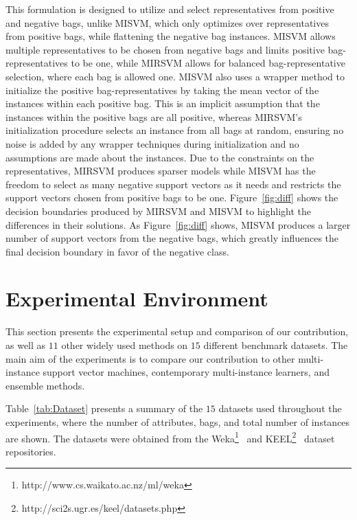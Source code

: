 \documentclass[reqno]{vcuthesis}
\numberwithin{equation}{chapter}
\begin{document}
This formulation is designed to utilize and select representatives from positive and negative bags, unlike MISVM, which only optimizes over representatives from positive bags, while flattening the negative bag instances. MISVM allows multiple representatives to be chosen from negative bags and limits positive bag-representatives to be one, while MIRSVM allows for balanced bag-representative selection, where each bag is allowed one. MISVM also uses a wrapper method to initialize the positive bag-representatives by taking the mean vector of the instances within each positive bag. This is an implicit assumption that the instances within the positive bags are all positive, whereas MIRSVM's initialization procedure selects an instance from all bags at random, ensuring no noise is added by any wrapper techniques during initialization and no assumptions are made about the instances. Due to the constraints on the representatives, MIRSVM produces sparser models while MISVM has the freedom to select as many negative support vectors as it needs and restricts the support vectors chosen from positive bags to be one. Figure~\ref{fig:diff} shows the decision boundaries produced by MIRSVM and MISVM to highlight the differences in their solutions. As Figure~\ref{fig:diff} shows, MISVM produces a larger number of support vectors from the negative bags, which greatly influences the final decision boundary in favor of the negative class.

\section{Experimental Environment}
This section presents the experimental setup and comparison of our contribution, as well as $11$ other widely used methods on $15$ different benchmark datasets. The main aim of the experiments is to compare our contribution to other multi-instance support vector machines, contemporary multi-instance learners, and ensemble methods. 

Table~\ref{tab:Dataset} presents a summary of the $15$ datasets used throughout the experiments, where the number of attributes, bags, and total number of instances are shown. The datasets were obtained from the Weka\footnote{http://www.cs.waikato.ac.nz/ml/weka}~\cite{Hall2009} and KEEL\footnote{http://sci2s.ugr.es/keel/datasets.php}~\cite{Alca2011} dataset repositories. 
\end{document}
